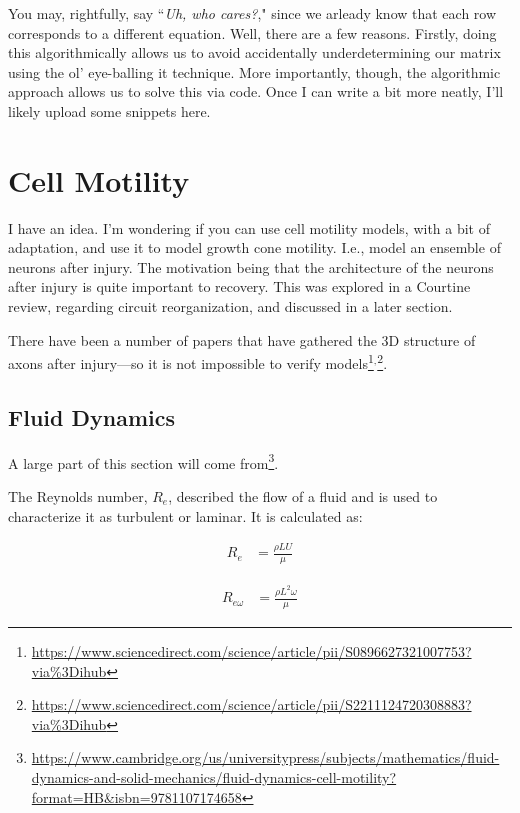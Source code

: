 \documentclass[12pt]{report}
\begin{document}
You may, rightfully, say ``\textit{Uh, who cares?}," since we arleady know that each row corresponds to a different equation. Well, there are a few reasons. Firstly, doing this algorithmically allows us to avoid accidentally underdetermining our matrix using the ol' eye-balling it technique. More importantly, though, the algorithmic approach allows us to solve this via code. Once I can write a bit more neatly, I'll likely upload some snippets here. 



\chapter{Cell Motility}

I have an idea. I'm wondering if you can use cell motility models, with a bit of adaptation, and use it to model growth cone motility. I.e., model an ensemble of neurons after injury. The motivation being that the architecture of the neurons after injury is quite important to recovery. This was explored in a Courtine review, regarding circuit reorganization, and discussed in a later section. \newline

There have been a number of papers that have gathered the 3D structure of axons after injury---so it is not impossible to verify models\footnote{\url{https://www.sciencedirect.com/science/article/pii/S0896627321007753?via\%3Dihub}}$^,$\footnote{\url{https://www.sciencedirect.com/science/article/pii/S2211124720308883?via\%3Dihub}}. 


\section{Fluid Dynamics}

A large part of this section will come from\footnote{\url{https://www.cambridge.org/us/universitypress/subjects/mathematics/fluid-dynamics-and-solid-mechanics/fluid-dynamics-cell-motility?format=HB&isbn=9781107174658}}.\newline

The Reynolds number, $R_e$, described the flow of a fluid and is used to characterize it as turbulent or laminar. It is calculated as: 

\begin{center}
\begin{multicols}{2}
    
\begin{equation} \label{Redefinition}
\begin{split}
R_e & = \frac{\rho LU}{\mu}
\end{split}
\end{equation}

\begin{equation} \label{Redefinition2}
\begin{split}
R_{e\omega} & = \frac{\rho L^2\omega}{\mu}
\end{split}
\end{equation}
\end{multicols}
\end{center}
\end{document}
